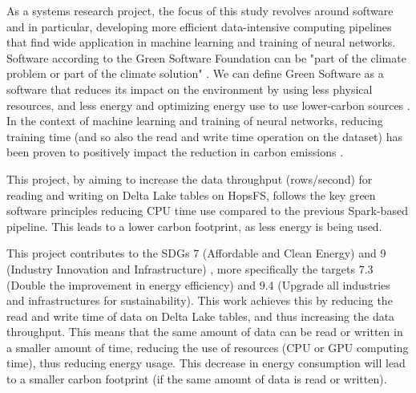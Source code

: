 As a systems research project, the focus of this study revolves around software and in particular, developing more efficient data-intensive computing pipelines that find wide application in machine learning and training of neural networks. Software according to the Green Software Foundation \cite{GreenSoftwareFoundation} can be "part of the climate problem or part of the climate solution" \cite{WhatGreenSoftware2021}. We can define Green Software as a software that reduces its impact on the environment by using less physical resources, and less energy and optimizing energy use to use lower-carbon sources \cite{WhatGreenSoftware2021}. In the context of machine learning and training of neural networks, reducing training time (and so also the read and write time operation on the dataset) has been proven to positively impact the reduction in carbon emissions \cite{pattersonCarbonEmissionsLarge2021,pattersonCarbonFootprintMachine2022}.

This project, by aiming to increase the data throughput (rows/second) for reading and writing on Delta Lake tables on \gls{HopsFS}, follows the key green software principles reducing CPU time use compared to the previous Spark-based pipeline. This leads to a lower carbon footprint, as less energy is being used.

This project contributes to the \glspl{SDG} 7 (Affordable and Clean Energy) and 9 (Industry Innovation and Infrastructure) \cite{SustainableDevelopment}, more specifically the targets 7.3 (Double the improvement in energy efficiency) and 9.4 (Upgrade all industries and infrastructures for sustainability). This work achieves this by reducing the read and write time of data on Delta Lake tables, and thus increasing the data throughput. This means that the same amount of data can be read or written in a smaller amount of time, reducing the use of resources (CPU or GPU computing time), thus reducing energy usage. This decrease in energy consumption will lead to a smaller carbon footprint (if the same amount of data is read or written). 

